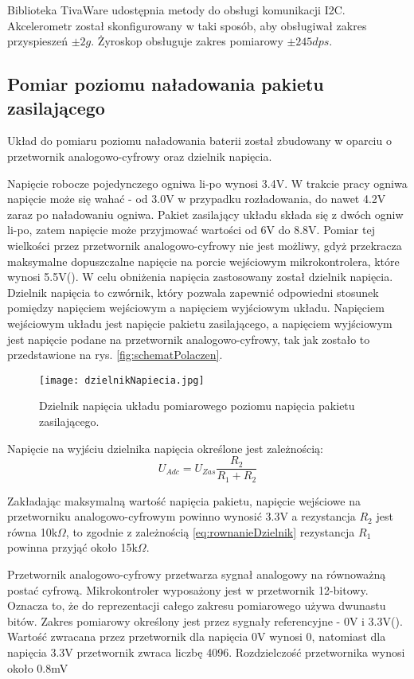 Biblioteka TivaWare udostępnia metody do obsługi komunikacji I2C. Akcelerometr został skonfigurowany w taki sposób, aby obsługiwał zakres przyspieszeń $\pm2g$. Żyroskop obsługuje zakres pomiarowy $\pm245dps$.
\subsection{Pomiar poziomu naładowania pakietu zasilającego}

Układ do pomiaru poziomu naładowania baterii został zbudowany w oparciu o przetwornik analogowo-cyfrowy oraz dzielnik napięcia. 

Napięcie robocze pojedynczego ogniwa li-po wynosi 3.4V. W trakcie pracy ogniwa napięcie może się wahać - od 3.0V w przypadku rozładowania, do nawet 4.2V zaraz po naładowaniu ogniwa. Pakiet zasilający układu składa się z dwóch ogniw li-po, zatem napięcie może przyjmować wartości od 6V do 8.8V. Pomiar tej wielkości przez przetwornik analogowo-cyfrowy nie jest możliwy, gdyż przekracza maksymalne dopuszczalne napięcie na porcie wejściowym mikrokontrolera, które wynosi 5.5V(\cite{tiva}). W celu obniżenia napięcia zastosowany został dzielnik napięcia. Dzielnik napięcia to czwórnik, który pozwala zapewnić odpowiedni stosunek pomiędzy napięciem wejściowym a napięciem wyjściowym układu. Napięciem wejściowym układu jest napięcie pakietu zasilającego, a napięciem wyjściowym jest napięcie podane na przetwornik analogowo-cyfrowy, tak jak zostało to przedstawione na rys. \ref{fig:schematPolaczen}.
\begin{figure}
    \centering
    \texttt{[image: dzielnikNapiecia.jpg]}
    \caption{Dzielnik napięcia układu pomiarowego poziomu napięcia pakietu zasilającego.}
    \label{fig:równia}
\end{figure}

Napięcie na wyjściu dzielnika napięcia określone jest zależnością:
\begin{equation}
    U_{Adc}=U_{Zas}\frac{R_2}{R_1 + R_2}
    \label{eq:rownanieDzielnik}
\end{equation}

Zakładając maksymalną wartość napięcia pakietu, napięcie wejściowe na przetworniku analogowo-cyfrowym powinno wynosić 3.3V a rezystancja $R_2$ jest równa 10k$\Omega$, to zgodnie z zależnością \ref{eq:rownanieDzielnik} rezystancja $R_1$ powinna przyjąć około 15k$\Omega$.

Przetwornik analogowo-cyfrowy przetwarza sygnał analogowy na równoważną postać cyfrową. Mikrokontroler wyposażony jest w przetwornik 12-bitowy. Oznacza to, że do reprezentacji całego zakresu pomiarowego używa dwunastu bitów. Zakres pomiarowy określony jest przez sygnały referencyjne - 0V i 3.3V(\cite{tiva}). Wartość zwracana przez przetwornik dla napięcia 0V wynosi 0, natomiast dla napięcia 3.3V przetwornik zwraca liczbę 4096. Rozdzielczość przetwornika wynosi około 0.8mV

